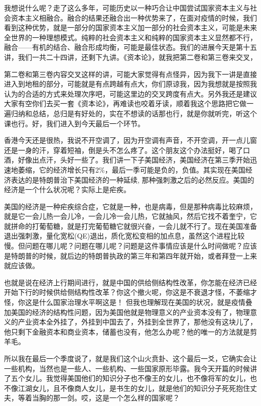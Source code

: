 \documentclass[UTF8, 12pt, a4paper]{ctexrep}
\begin{document}
我想说什么呢？走了这么多年，可能历史以一种巧合让中国尝试国家资本主义与社会资本主义相融合。融合的结果还融合出一种优势来了，在面对疫情的时候，我们看到这种优势，就是一部分的国家资本主义加一部分的社会资本主义，可能是未来全世界的一种理想模式。纯粹的社会资本主义和纯粹的国家资本主义显然都不行，融合——有机的结合、融合形成均衡，可能是最佳状态。我们的进展今天是第十五讲，我们一共二十四讲，还剩下九讲。《资本论》，就我把第二卷和第三卷来交叉，

第二卷和第三卷内容交叉这样的讲，可能大家觉得有点怪异，因为我下一讲是直接进入到地租的部分，可能就是有点跨越有点大，你们原谅我，因为我想就是按照我认为的合适的方式来处理次序吧，可能这里边的交叉跨度有点大。另外我还是建议大家有空你们去买一套《资本论》，再难读也咬着牙读，顺着我这个思路把它做一遍归纳和总结，总归是有好处的，实在不想读的话那也行，就是你就听完，听这个课也行。好，我们进入到今天最后一个环节。

香港今天还是很热，我说不开空调了，因为开空调有声音，不开空调，开一点儿窗还是一身的汗，穿着短袖，倒是头不怎么疼了。这个朋友这个办法挺好，喝了口酒，好像出点汗，头好一些了。我们讲一下子美国经济，美国经济在第三季开始迅速地萎缩，它的经济增长只有2\%，最后一季可能是负的，负值。其实现在美国经济表达的是特朗普治下美国经济的一种延续, 那种强刺激之后的必然反应。美国的经济是一个什么状况呢？实际上是疟疾。

美国的经济是一种疟疾综合症，它就是一种，也是病毒，但是那种病毒比较麻烦，就是它一会儿热一会儿冷，一会儿冷一会儿热，它就抽风，然后它找不着奎宁，它就拼命的打葡萄糖，就是打完葡萄糖它就很兴奋，一会儿就不行了。现在美国准备退出强刺激，量化宽松(QE)退出，质化宽松变相的加点息，虽然这个进程比较慢。但问题在哪儿呢？问题在哪儿呢？问题是这件事情应该是什么时间做呢？应该是特朗普的时候，就后边的特朗普执政的第三年和第四年就开始，或者拜登一上来就应该做。

也就是说在经济上行期间进行，就是中国的供给侧结构性改革，你怎能在经济已经开始下行的时候供给侧结构性改革？你这个撤火呢，你这是不衰退才怪，不萎缩才怪，你这是什么国家治理水平啊这是！ 但我也理解现在美国的状况，就是疫情叠加美国的经济的结构性问题，因为美国他就是物理意义的产业资本没有了，物理意义的产业资本全外挂了，外挂到中国去了，外挂到全世界了，那他没有这块儿了，他只剩下金融资本和商业资本，储蓄也没有，他怎么办呢？他的唯一的方法就是剪羊毛。

所以我在最后一个季度说了，就是我们这个山火贲卦、这个最后一爻，它确实会让一些机构，当然也是一些人、一些机构、一些国家原形毕露。我今天开篇的时候讲了五个女儿。我觉得美国他们的知识分子也不像王的女儿，也不像将军的女儿，也不像江湖女儿，且不像商人女儿，是书生的女儿，就是他们的知识分子死死抱住丈夫，等着当胸的那一剑。哎，这是一个怎么样的国家呢？
\end{document}

